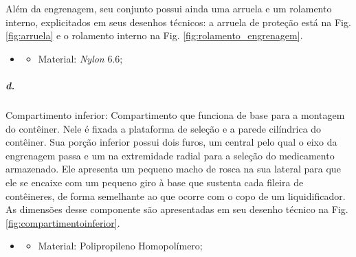     
    Além da engrenagem, seu conjunto possui ainda uma arruela e um rolamento interno, explicitados em seus desenhos técnicos: a arruela de proteção está na Fig. \ref{fig:arruela} e o rolamento interno na Fig. \ref{fig:rolamento_engrenagem}.
    
    \begin{itemize}
   \item[]
  \begin{itemize}
        \item Material: \textit{Nylon} 6.6;
   \end{itemize}
   \end{itemize}
   
    
    \subparagraph*{d.} \label{retorno_compartimentoinferior}
    Compartimento inferior: Compartimento que funciona de base para a montagem do contêiner. Nele é fixada a plataforma de seleção e a parede cilíndrica do contêiner. Sua porção inferior possui dois furos, um central pelo qual o eixo da engrenagem passa e um na extremidade radial para a seleção do medicamento armazenado. Ele apresenta um pequeno macho de rosca na sua lateral para que ele se encaixe com um pequeno giro à base que sustenta cada fileira de contêineres, de forma semelhante ao que ocorre com o copo de um liquidificador. As dimensões desse componente são apresentadas em seu desenho técnico na Fig. \ref{fig:compartimentoinferior}.
    
    \begin{itemize}
   \item[]
   \begin{itemize}
       \item Material: Polipropileno Homopolímero;
   \end{itemize}
   \end{itemize}
     

